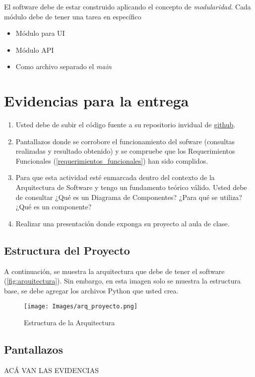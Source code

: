 \documentclass[12pt]{article}
\begin{document}
El software debe de estar construido aplicando el concepto de \textit{modularidad}. Cada módulo debe de tener una tarea en específico 


\begin{itemize}
\item Módulo para UI
\item Módulo API
\item Como archivo separado el \textit{main}
\end{itemize}


\section{Evidencias para la entrega}

\begin{enumerate}
    \item Usted debe de subir el código fuente a su repositorio invidual de  \href{https://github.com/}{github}. 
    
    \item Pantallazos donde se corrobore el funcionamiento del sofware (consultas realizadas y resultado obtenido) y se compruebe que los Requerimientos Funcionales (\autoref{requerimientos_funcionales}) han sido complidos.
    
    \item Para que esta actividad esté enmarcada dentro del contexto de la Arquitectura de Software y tengo un fundamento teórico válido. Usted debe de consultar ¿Qué es un Diagrama de Componentes? ¿Para qué se utiliza? ¿Qué es un componente?

    \item Realizar una presentación donde exponga su proyecto al aula de clase.
\end{enumerate}

\newpage
\subsection{Estructura del Proyecto}

A continuación, se muestra la arquitectura que debe de tener el software (\autoref{fig:arquitectura}). Sin embargo, en esta imagen solo se muestra la estructura base, se debe agregar los archivos Python que usted crea.


\begin{figure}[h!]
    \centering
    \texttt{[image: Images/arq\_proyecto.png]}
    \caption{Estructura de la Arquitectura}
    \label{fig:arquitectura}
\end{figure}


\subsection{Pantallazos}

ACÁ VAN LAS EVIDENCIAS
\end{document}
